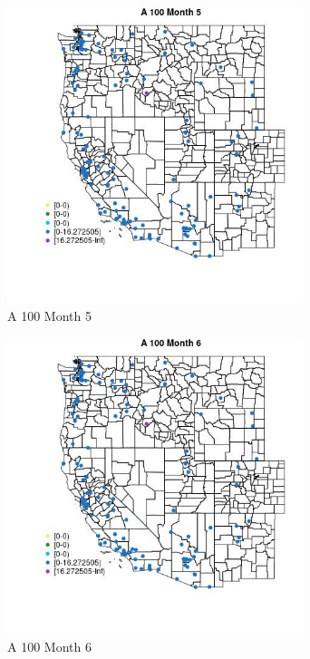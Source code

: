 \begin{figure} 
\centering  
\includegraphics[width=0.77\textwidth]{Code_Outputs/Report_ML_input_PM25_Step4_part_e_de_duplicated_aves_MapObsMo5A_100.jpg} 
\caption{\label{fig:Report_ML_input_PM25_Step4_part_e_de_duplicated_avesMapObsMo5A_100}A 100 Month 5} 
\end{figure} 
 

\begin{figure} 
\centering  
\includegraphics[width=0.77\textwidth]{Code_Outputs/Report_ML_input_PM25_Step4_part_e_de_duplicated_aves_MapObsMo6A_100.jpg} 
\caption{\label{fig:Report_ML_input_PM25_Step4_part_e_de_duplicated_avesMapObsMo6A_100}A 100 Month 6} 
\end{figure} 
 

